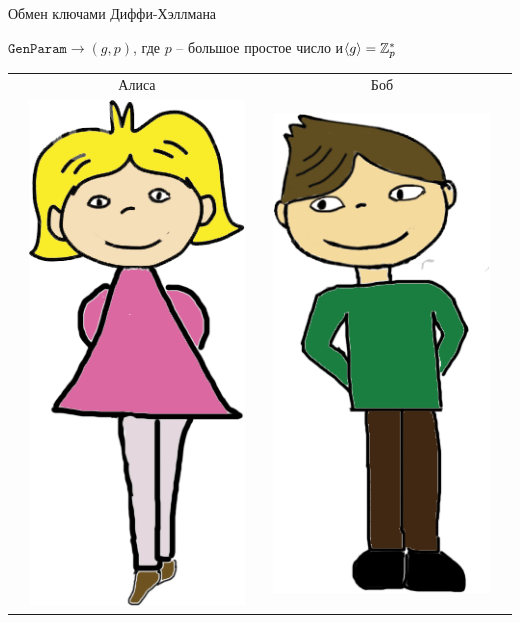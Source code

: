 \documentclass[usenames,dvipsnames,8pt,aspectratio=169]{beamer}
\begin{document}
\begin{frame}{Обмен ключами Диффи-Хэллмана}
\Large
\begin{center}
$\mathtt{GenParam} \rightarrow (g, p)$, где $p$ -- большое простое число и$\langle g \rangle = {{\mathbb Z}}_p^\ast$
\large 
	\begin{center}
		\begin{tabular}{l c c c l}
			& Алиса  & & Боб &  \\
			& \multirow{5}{*}{\includegraphics[scale=0.15]{Alice}} & & 
			\multirow{5}{*}{\includegraphics[scale=0.15]{Bob}} &    \\

\end{tabular}
\end{center}
\end{center}
\end{frame}
\end{document}
